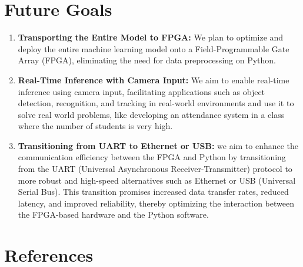 \documentclass{article}
\begin{document}
\section{Future Goals}
        \begin{enumerate}
            \item \textbf{Transporting the Entire Model to FPGA: }We plan to optimize and deploy the entire machine learning model onto a Field-Programmable Gate Array (FPGA), eliminating the need for data preprocessing on Python.

            \item \textbf{Real-Time Inference with Camera Input: }We aim to enable real-time inference using camera input, facilitating applications such as object detection, recognition, and tracking in real-world environments and use it to solve real world problems, like developing an attendance system in a class where the number of students is very high.

            \item \textbf{Transitioning from UART to Ethernet or USB: }we aim to enhance the communication efficiency between the FPGA and Python by transitioning from the UART (Universal Asynchronous Receiver-Transmitter) protocol to more robust and high-speed alternatives such as Ethernet or USB (Universal Serial Bus). This transition promises increased data transfer rates, reduced latency, and improved reliability, thereby optimizing the interaction between the FPGA-based hardware and the Python software.
        \end{enumerate}
     \newpage
     \section{References}
\end{document}
